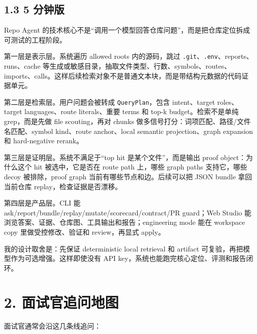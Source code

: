 \documentclass[UTF8,12pt,openany]{ctexbook}
\begin{document}
\subsection{1.3 5 分钟版}

Repo Agent 的技术核心不是“调用一个模型回答仓库问题”，而是把仓库定位拆成可测试的工程阶段。\par

第一层是表示层。系统遍历 allowed roots 内的源码，跳过 \texttt{.git}、\texttt{.env}、reports、runs、cache 等生成或敏感目录，抽取文件类型、行数、symbols、routes、imports、calls。这样后续检索对象不是普通文本块，而是带结构元数据的代码证据单元。\par

第二层是检索层。用户问题会被转成 \texttt{QueryPlan}，包含 intent、target roles、target languages、route literals、重要 terms 和 top-k budget。检索不是单纯 grep，而是先做 file scouting，再对 chunks 做多信号打分：词项匹配、路径/文件名匹配、symbol kind、route anchor、local semantic projection、graph expansion 和 hard-negative rerank。\par

第三层是证明层。系统不满足于“top hit 是某个文件”，而是输出 proof object：为什么这个 hit 被选中，它是否在 route path 上，哪些 graph paths 支持它，哪些 decoy 被排除，proof graph 当前有哪些节点和边。后续可以把 JSON bundle 拿回当前仓库 replay，检查证据是否漂移。\par

第四层是产品层。CLI 能 ask/report/bundle/replay/mutate/scorecard/contract/PR guard；Web Studio 能浏览答案、证据、仓库图、工具输出和报告；engineering mode 能在 workspace copy 里做受控修改、验证和 review，再显式 apply。\par

我的设计取舍是：先保证 deterministic local retrieval 和 artifact 可复验，再把模型作为可选增强。这样即使没有 API key，系统也能跑完核心定位、评测和报告闭环。\par

\section{2. 面试官追问地图}

面试官通常会沿这几条线追问：\par
\end{document}
